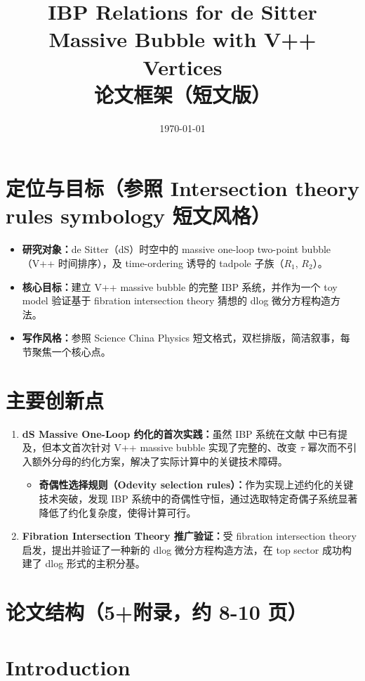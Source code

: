 \documentclass[UTF8,a4paper,11pt]{ctexart}
\title{IBP Relations for de Sitter Massive Bubble with V++ Vertices\\[2mm]
\normalsize 论文框架（短文版）}
\author{}
\date{\today}
\begin{document}
\maketitle

\section*{定位与目标（参照 Intersection theory rules symbology 短文风格）}
\begin{itemize}
  \item \textbf{研究对象：}de Sitter（dS）时空中的 massive one-loop two-point bubble（V++ 时间排序），及 time-ordering 诱导的 tadpole 子族（$R_1$, $R_2$）。
  \item \textbf{核心目标：}建立 V++ massive bubble 的完整 IBP 系统，并作为一个 toy model 验证基于 fibration intersection theory 猜想的 dlog 微分方程构造方法。
  \item \textbf{写作风格：}参照 Science China Physics 短文格式，双栏排版，简洁叙事，每节聚焦一个核心点。
\end{itemize}

\section*{主要创新点}
\begin{enumerate}
  \item \textbf{dS Massive One-Loop 约化的首次实践：}虽然 IBP 系统在文献 \cite{} 中已有提及，但本文首次针对 V++ massive bubble 实现了完整的、改变 $\tau$ 幂次而不引入额外分母的约化方案，解决了实际计算中的关键技术障碍。
    \begin{itemize}
        \item \textbf{奇偶性选择规则（Odevity selection rules）：}作为实现上述约化的关键技术突破，发现 IBP 系统中的奇偶性守恒，通过选取特定奇偶子系统显著降低了约化复杂度，使得计算可行。
    \end{itemize}
  \item \textbf{Fibration Intersection Theory 推广验证：}受 fibration intersection theory 启发，提出并验证了一种新的 dlog 微分方程构造方法，在 top sector 成功构建了 dlog 形式的主积分基。
\end{enumerate}

\section*{论文结构（5+附录，约 8-10 页）}

\section{Introduction}
\end{document}
